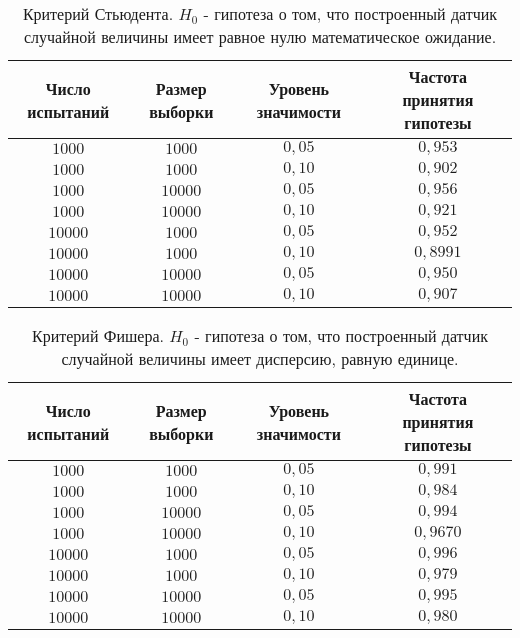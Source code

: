 \documentclass[a4paper, 11pt]{article}
\theoremstyle{def}
\theoremstyle{th}
\theoremstyle{rem}
\begin{document}
\begin{table}[h]
\begin{center}
\begin{tabular}{|c|c|c|c|}
\hline
Число испытаний &
Размер выборки  &
Уровень значимости &
Частота принятия гипотезы
\\
\hline
$1000$
&
$1000$
&
$0,05$
&
$0,953$
\\
\hline
$1000$
&
$1000$
&
$0,10$
&
$0,902$
\\
\hline
$1000$
&
$10000$
&
$0,05$
&
$0,956$
\\
\hline
$1000$
&
$10000$
&
$0,10$
&
$0,921$
\\
\hline
$10000$
&
$1000$
&
$0,05$
&
$0,952$
\\
\hline
$10000$
&
$1000$
&
$0,10$
&
$0,8991$
\\
\hline
$10000$
&
$10000$
&
$0,05$
&
$0,950$
\\
\hline
$10000$
&
$10000$
&
$0,10$
&
$0,907$
\\
\hline
\end{tabular}
\end{center}
\caption{Критерий Стьюдента. $H_0$ - гипотеза о том, что построенный датчик случайной величины имеет равное нулю математическое ожидание.}
\end{table}

\begin{table}[H]
\begin{center}
\begin{tabular}{|c|c|c|c|}
\hline
Число испытаний &
Размер выборки  &
Уровень значимости &
Частота принятия гипотезы
\\
\hline
$1000$
&
$1000$
&
$0,05$
&
$0,991$
\\
\hline
$1000$
&
$1000$
&
$0,10$
&
$0,984$
\\
\hline
$1000$
&
$10000$
&
$0,05$
&
$0,994$
\\
\hline
$1000$
&
$10000$
&
$0,10$
&
$0,9670$
\\
\hline
$10000$
&
$1000$
&
$0,05$
&
$0,996$
\\
\hline
$10000$
&
$1000$
&
$0,10$
&
$0,979$
\\
\hline
$10000$
&
$10000$
&
$0,05$
&
$0,995$
\\
\hline
$10000$
&
$10000$
&
$0,10$
&
$0,980$
\\
\hline
\end{tabular}
\end{center}
\caption{Критерий Фишера. $H_0$ - гипотеза о том, что построенный датчик случайной величины имеет дисперсию, равную единице.}
\end{table}
\end{document}
